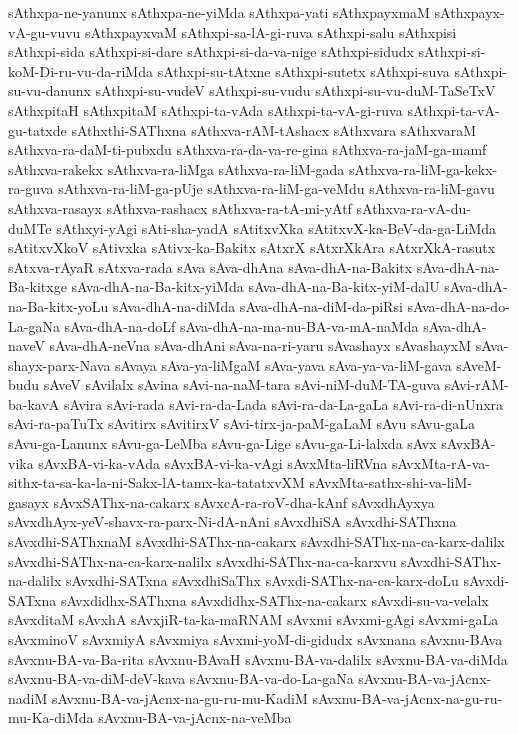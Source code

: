 {sAthxpa-ne-yanunx
sAthxpa-ne-yiMda
sAthxpa-yati
sAthxpayxmaM
sAthxpayx-vA-gu-vuvu
sAthxpayxvaM
sAthxpi-sa-lA-gi-ruva
sAthxpi-salu
sAthxpisi
sAthxpi-sida
sAthxpi-si-dare
sAthxpi-si-da-va-nige
sAthxpi-sidudx
sAthxpi-si-koM-Di-ru-vu-da-riMda
sAthxpi-su-tAtxne
sAthxpi-sutetx
sAthxpi-suva
sAthxpi-su-vu-danunx
sAthxpi-su-vudeV
sAthxpi-su-vudu
sAthxpi-su-vu-duM-TaSeTxV
sAthxpitaH
sAthxpitaM
sAthxpi-ta-vAda
sAthxpi-ta-vA-gi-ruva
sAthxpi-ta-vA-gu-tatxde
sAthxthi-SAThxna
sAthxva-rAM-tAshacx
sAthxvara
sAthxvaraM
sAthxva-ra-daM-ti-pubxdu
sAthxva-ra-da-va-re-gina
sAthxva-ra-jaM-ga-mamf
sAthxva-rakekx
sAthxva-ra-liMga
sAthxva-ra-liM-gada
sAthxva-ra-liM-ga-kekx-ra-guva
sAthxva-ra-liM-ga-pUje
sAthxva-ra-liM-ga-veMdu
sAthxva-ra-liM-gavu
sAthxva-rasayx
sAthxva-rashacx
sAthxva-ra-tA-mi-yAtf
sAthxva-ra-vA-du-duMTe
sAthxyi-yAgi
sAti-sha-yadA
sAtitxvXka
sAtitxvX-ka-BeV-da-ga-LiMda
sAtitxvXkoV
sAtivxka
sAtivx-ka-Bakitx
sAtxrX
sAtxrXkAra
sAtxrXkA-rasutx
sAtxva-rAyaR
sAtxva-rada
sAva
sAva-dhAna
sAva-dhA-na-Bakitx
sAva-dhA-na-Ba-kitxge
sAva-dhA-na-Ba-kitx-yiMda
sAva-dhA-na-Ba-kitx-yiM-dalU
sAva-dhA-na-Ba-kitx-yoLu
sAva-dhA-na-diMda
sAva-dhA-na-diM-da-piRsi
sAva-dhA-na-do-La-gaNa
sAva-dhA-na-doLf
sAva-dhA-na-ma-nu-BA-va-mA-naMda
sAva-dhA-naveV
sAva-dhA-neVna
sAva-dhAni
sAva-na-ri-yaru
sAvashayx
sAvashayxM
sAva-shayx-parx-Nava
sAvaya
sAva-ya-liMgaM
sAva-yava
sAva-ya-va-liM-gava
sAveM-budu
sAveV
sAvilalx
sAvina
sAvi-na-naM-tara
sAvi-niM-duM-TA-guva
sAvi-rAM-ba-kavA
sAvira
sAvi-rada
sAvi-ra-da-Lada
sAvi-ra-da-La-gaLa
sAvi-ra-di-nUnxra
sAvi-ra-paTuTx
sAvitirx
sAvitirxV
sAvi-tirx-ja-paM-gaLaM
sAvu
sAvu-gaLa
sAvu-ga-Lanunx
sAvu-ga-LeMba
sAvu-ga-Lige
sAvu-ga-Li-lalxda
sAvx
sAvxBA-vika
sAvxBA-vi-ka-vAda
sAvxBA-vi-ka-vAgi
sAvxMta-liRVna
sAvxMta-rA-va-sithx-ta-sa-ka-la-ni-Sakx-lA-tamx-ka-tatatxvXM
sAvxMta-sathx-shi-va-liM-gasayx
sAvxSAThx-na-cakarx
sAvxcA-ra-roV-dha-kAnf
sAvxdhAyxya
sAvxdhAyx-yeV-shavx-ra-parx-Ni-dA-nAni
sAvxdhiSA
sAvxdhi-SAThxna
sAvxdhi-SAThxnaM
sAvxdhi-SAThx-na-cakarx
sAvxdhi-SAThx-na-ca-karx-dalilx
sAvxdhi-SAThx-na-ca-karx-nalilx
sAvxdhi-SAThx-na-ca-karxvu
sAvxdhi-SAThx-na-dalilx
sAvxdhi-SATxna
sAvxdhiSaThx
sAvxdi-SAThx-na-ca-karx-doLu
sAvxdi-SATxna
sAvxdidhx-SAThxna
sAvxdidhx-SAThx-na-cakarx
sAvxdi-su-va-velalx
sAvxditaM
sAvxhA
sAvxjiR-ta-ka-maRNAM
sAvxmi
sAvxmi-gAgi
sAvxmi-gaLa
sAvxminoV
sAvxmiyA
sAvxmiya
sAvxmi-yoM-di-gidudx
sAvxnana
sAvxnu-BAva
sAvxnu-BA-va-Ba-rita
sAvxnu-BAvaH
sAvxnu-BA-va-dalilx
sAvxnu-BA-va-diMda
sAvxnu-BA-va-diM-deV-kava
sAvxnu-BA-va-do-La-gaNa
sAvxnu-BA-va-jAcnx-nadiM
sAvxnu-BA-va-jAcnx-na-gu-ru-mu-KadiM
sAvxnu-BA-va-jAcnx-na-gu-ru-mu-Ka-diMda
sAvxnu-BA-va-jAcnx-na-veMba
}
